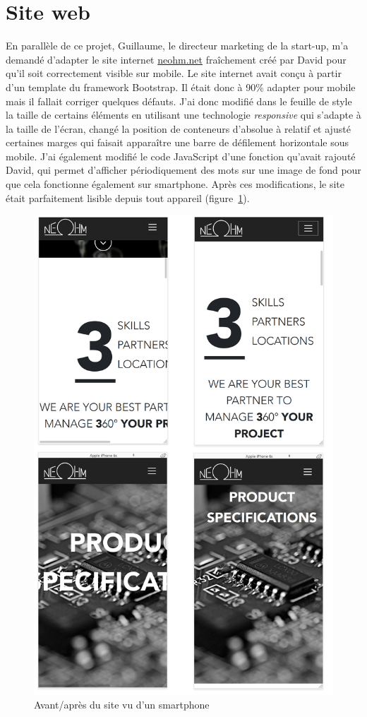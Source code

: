 \documentclass[a4paper, 12pt, sffamily]{report}
\begin{document}
\section{Site web}
En parallèle de ce projet, Guillaume, le directeur marketing de la start-up, m’a demandé d’adapter le site internet \url{neohm.net} fraîchement créé par David pour qu’il soit correctement visible sur mobile.
Le site internet avait conçu à partir d’un template du framework Bootstrap. Il était donc à 90\% adapter pour mobile mais il fallait corriger quelques défauts. J'ai donc modifié dans le feuille de style la taille de certains éléments en utilisant une technologie \emph{responsive} qui s’adapte à la taille de l’écran, changé la position de conteneurs d’absolue à relatif et ajusté certaines marges qui faisait apparaître une barre de défilement horizontale sous mobile. J’ai également modifié le code JavaScript d’une fonction qu’avait rajouté David, qui permet d’afficher périodiquement des mots sur une image de fond pour que cela fonctionne également sur smartphone. Après ces modifications, le site était parfaitement lisible depuis tout appareil (figure~\ref{fig:website}).

\begin{figure}[H]
\centering
\includegraphics[scale=0.25]{figures/screenshots/website.png}
\caption{Avant/après du site vu d’un smartphone}
\label{fig:website}
\end{figure}
\end{document}
